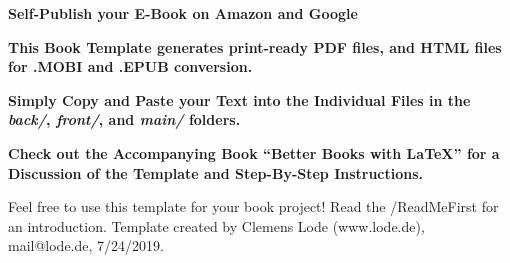 

\thispagestyle{empty}

	\begin{center}

  \bfseries \sffamily \Huge Self-Publish your E-Book on Amazon and Google\par
	\bfseries \LARGE This Book Template generates print-ready PDF files, and HTML files for .MOBI and .EPUB conversion.\par
    \bfseries \LARGE Simply Copy and Paste your Text into the Individual Files in the \textit{back/}, \textit{front/}, and \textit{main/} folders.\par
    \bfseries \LARGE Check out the Accompanying Book ``Better Books with LaTeX'' for a Discussion of the Template and Step-By-Step Instructions.\par
    \Large Feel free to use this template for your book project! Read the /ReadMeFirst for an introduction. Template created by Clemens Lode (www.lode.de), mail@lode.de, 7/24/2019.
	\end{center}
\newpage

